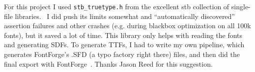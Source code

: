 \documentclass[twocolumn]{article} %
\begin{document}
For this project I used \verb+stb_truetype.h+ from the excellent stb
collection of single-file libraries.~\cite{stb} I did push its limits
somewhat and ``automatically discovered'' assertion failures and other
crashes (e.g. during blackbox optimization on all 100k fonts), but it
saved a lot of time. This library only helps with reading the fonts
and generating SDFs. To generate TTFs, I had to write my own pipeline,
which generates FontForge's .SFD (a typo factory right there) files,
and then did the final export with FontForge~\cite{fontforge}. Thanks
Jason Reed for this suggestion.


\nocite{murphy2019blind}
\nocite{murphy2019eloworld}
\nocite{stb}

{}

\end{document}
